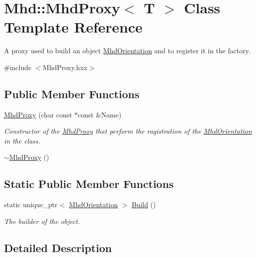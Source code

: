 \hypertarget{classMhd_1_1MhdProxy}{\section{\-Mhd\-:\-:\-Mhd\-Proxy$<$ \-T $>$ \-Class \-Template \-Reference}
\label{classMhd_1_1MhdProxy}
}


\-A proxy used to build an object \hyperlink{classMhd_1_1MhdOrientation}{\-Mhd\-Orientation} and to register it in the factory.  




{\ttfamily \#include $<$\-Mhd\-Proxy.\-hxx$>$}

\subsection*{\-Public \-Member \-Functions}
\begin{DoxyCompactItemize}
\item 
\hyperlink{classMhd_1_1MhdProxy_a593d864056c0c48527b5442cc1d041dc}{\-Mhd\-Proxy} (char const $\ast$const \&\-Name)
\begin{DoxyCompactList}\small\item\em \-Constructor of the \hyperlink{classMhd_1_1MhdProxy}{\-Mhd\-Proxy} that perform the ragistration of the \hyperlink{classMhd_1_1MhdOrientation}{\-Mhd\-Orientation} in the class. \end{DoxyCompactList}\item 
\hyperlink{classMhd_1_1MhdProxy_a0d0a220bae333baae25e2d7431005710}{$\sim$\-Mhd\-Proxy} ()
\end{DoxyCompactItemize}
\subsection*{\-Static \-Public \-Member \-Functions}
\begin{DoxyCompactItemize}
\item 
static unique\-\_\-ptr$<$ \hyperlink{classMhd_1_1MhdOrientation}{\-Mhd\-Orientation} $>$ \hyperlink{classMhd_1_1MhdProxy_a7ae07a705a897fd4e00e1fb474282593}{\-Build} ()
\begin{DoxyCompactList}\small\item\em \-The builder of the object. \end{DoxyCompactList}\end{DoxyCompactItemize}


\subsection{\-Detailed \-Description}
